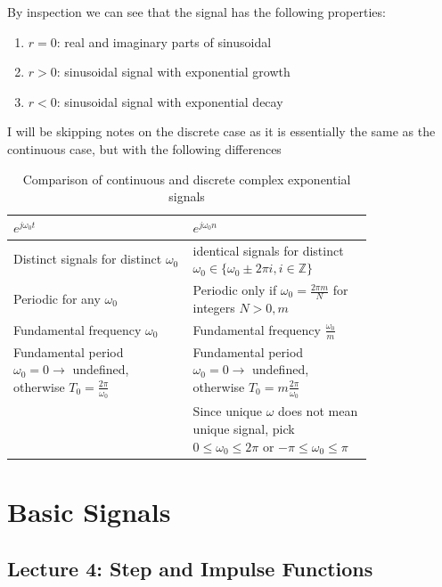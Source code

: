 \documentclass[../notes.tex]{subfiles}
\begin{document}
By inspection we can see that the signal has the following properties:

\begin{enumerate}
	\item $ r = 0 $: real and imaginary parts of sinusoidal
	\item $ r > 0 $: sinusoidal signal with exponential growth
	\item $ r < 0 $: sinusoidal signal with exponential decay
\end{enumerate}


I will be skipping notes on the discrete case as it is essentially the same as the continuous case, but with the following differences

\begin{table}[H]
	\centering
	\caption{Comparison of continuous and discrete complex exponential signals}
	\label{tab:label}
	\begin{tabular}{|p{0.4\linewidth}|p{0.4\linewidth}|}
		\hline
	 $ e^{j\omega_0t} $ & $ e^{j\omega_0n} $   \\ \hline
	 Distinct signals for distinct $\omega_{0} $ & identical signals for distinct $ \omega_0 \in \{\omega_0 \pm 2\pi i, i \in \mathbb{Z}\} $   \\ \hline
	 Periodic for any $ \omega_0 $ & Periodic only if $ \omega_0 = \frac{2\pi m}{N}  $ for integers $ N>0, m $  \\ \hline
	 Fundamental frequency  $ \omega_0 $ & Fundamental frequency $\frac{\omega_0}{m}$  \\ \hline
	 Fundamental period $ \omega_0 = 0 \rightarrow $ undefined, otherwise $ T_0 = \frac{2\pi}{\omega_0} $ & Fundamental period $ \omega_0 = 0 \rightarrow $ undefined, otherwise $ T_0 = m\frac{2\pi}{\omega_0} $  \\ \hline
																																																				& Since unique $ \omega $ does not mean unique signal, pick $ 0 \le \omega_0 \le 2\pi $ or $ -\pi \le \omega_0 \le  \pi$  \\
	 \hline
	\end{tabular}
\end{table}

\section{Basic Signals}

\subsection{Lecture 4: Step and Impulse Functions}
\end{document}
